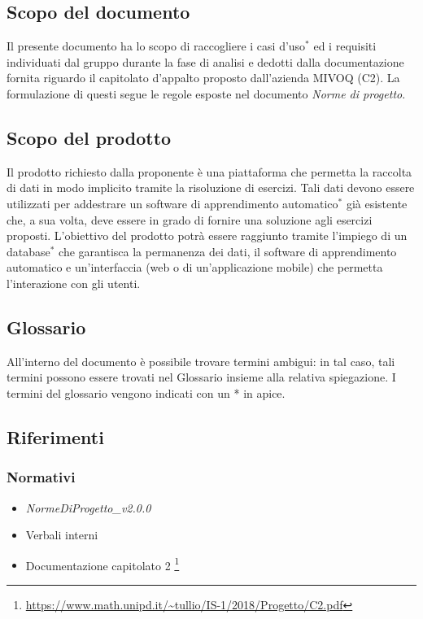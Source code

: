 \subsection{Scopo del documento}
	Il presente documento ha lo scopo di raccogliere i casi d'uso$^*$ ed i requisiti individuati dal gruppo durante la fase di analisi e dedotti dalla documentazione fornita riguardo il capitolato d'appalto proposto dall'azienda MIVOQ (C2). La formulazione di questi segue le regole esposte nel documento \textit{Norme di progetto}.

\subsection{Scopo del prodotto}
	Il prodotto richiesto dalla proponente è una piattaforma che permetta la raccolta di dati in modo implicito tramite la risoluzione di esercizi. Tali dati devono essere utilizzati per addestrare un software di apprendimento automatico$^*$ già esistente che, a sua volta, deve essere in grado di fornire una soluzione agli esercizi proposti. L'obiettivo del prodotto potrà essere raggiunto tramite l'impiego di un database$^*$ che garantisca la permanenza dei dati, il software di apprendimento automatico e un'interfaccia (web o di un'applicazione mobile) che permetta l'interazione con gli utenti.

\subsection{Glossario}
	All'interno del documento è possibile trovare termini ambigui: in tal caso, tali termini possono essere trovati nel Glossario insieme alla relativa spiegazione. I termini del glossario vengono indicati con un * in apice.
	
\subsection{Riferimenti}
	\subsubsection{Normativi}
	\begin{itemize}
		\item \textit{NormeDiProgetto\_v2.0.0}
		\item Verbali interni
		\item Documentazione capitolato 2 \footnote{\url{https://www.math.unipd.it/~tullio/IS-1/2018/Progetto/C2.pdf}}
	
	\end{itemize}
